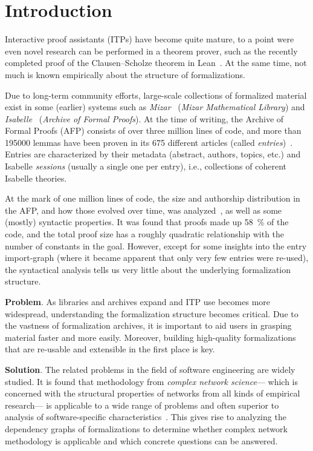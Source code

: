 \section{Introduction}
Interactive proof assistants (ITPs) have become quite mature,
to a point were even novel research can be performed in a theorem prover,
such as the recently completed proof of the Clausen--Scholze theorem in Lean~\cite{Proof2021Scholze}.
At the same time,
not much is known empirically about the structure of formalizations.

Due to long-term community efforts,
large-scale collections of formalized material exist in some (earlier) systems
such as \emph{Mizar}~\cite{Mizar1992Rudnicki} (\emph{Mizar Mathematical Library}) and \emph{Isabelle}~\cite{Isabelle1998Paulson} (\emph{Archive of Formal Proofs}).
At the time of writing, the Archive of Formal Proofs (AFP) consists of over three million lines of code,
and more than \num{195000} lemmas have been proven
in its \num{675} different articles (called \emph{entries})~\cite{Statistics2022Afp}.
Entries are characterized by their metadata (abstract, authors, topics, etc.)
and Isabelle \emph{sessions} (usually a single one per entry),
i.e., collections of coherent Isabelle theories.

At the mark of one million lines of code,
the size and authorship distribution in the AFP, and how those evolved over time, was analyzed~\cite{MiningAFP2015Blanchette},
as well as some (mostly) syntactic properties.
It was found that proofs made up \SI{58}{\percent} of the code,
and the total proof size has a roughly quadratic relationship with the number of constants in the goal.
However, except for some insights into the entry import-graph
(where it became apparent that only very few entries were re-used),
the syntactical analysis tells us very little about the underlying formalization structure.

\textbf{Problem}.
As libraries and archives expand and ITP use becomes more widespread,
understanding the formalization structure becomes critical.
Due to the vastness of formalization archives,
it is important to aid users in grasping material faster and more easily.
Moreover, building high-quality formalizations
that are re-usable and extensible in the first place is key.

\textbf{Solution}.
The related problems in the field of software engineering are widely studied.
It is found that methodology from \emph{complex network science}---%
which is concerned with the structural properties of networks from all kinds of empirical research---%
is applicable to a wide range of problems
and often superior to analysis of software-specific characteristics~\cite{DefectsMetrics2008Zimmermann,FractalDimension2013Turnu}.
This gives rise to analyzing the dependency graphs of formalizations
to determine whether complex network methodology is applicable
and which concrete questions can be answered.

